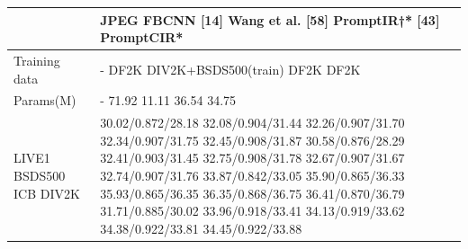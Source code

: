 \begin{tabular}{ll}
\toprule
 & JPEG FBCNN [14] Wang et al. [58] PromptIR†* [43] PromptCIR* \\
\midrule
Training data & - DF2K DIV2K+BSDS500(train) DF2K DF2K \\
Params(M) & - 71.92 11.11 36.54 34.75 \\
LIVE1 BSDS500 ICB DIV2K & 30.02/0.872/28.18 32.08/0.904/31.44 32.26/0.907/31.70 32.34/0.907/31.75 32.45/0.908/31.87 30.58/0.876/28.29 32.41/0.903/31.45 32.75/0.908/31.78 32.67/0.907/31.67 32.74/0.907/31.76 33.87/0.842/33.05 35.90/0.865/36.33 35.93/0.865/36.35 36.35/0.868/36.75 36.41/0.870/36.79 31.71/0.885/30.02 33.96/0.918/33.41 34.13/0.919/33.62 34.38/0.922/33.81 34.45/0.922/33.88 \\
\bottomrule
\end{tabular}
